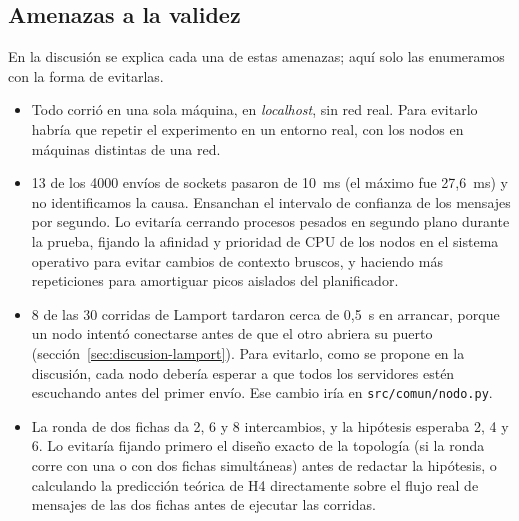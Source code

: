 \subsection{Amenazas a la validez}

En la discusión se explica cada una de estas amenazas; aquí solo las enumeramos con la forma de evitarlas.

\begin{itemize}
  \item Todo corrió en una sola máquina, en \emph{localhost}, sin red real. Para evitarlo habría que repetir el experimento en un entorno real, con los nodos en máquinas distintas de una red.
  \item 13 de los 4000 envíos de sockets pasaron de 10~ms (el máximo fue 27,6~ms) y no identificamos la causa. Ensanchan el intervalo de confianza de los mensajes por segundo. Lo evitaría cerrando procesos pesados en segundo plano durante la prueba, fijando la afinidad y prioridad de CPU de los nodos en el sistema operativo para evitar cambios de contexto bruscos, y haciendo más repeticiones para amortiguar picos aislados del planificador.
  \item 8 de las 30 corridas de Lamport tardaron cerca de 0,5~s en arrancar, porque un nodo intentó conectarse antes de que el otro abriera su puerto (sección~\ref{sec:discusion-lamport}). Para evitarlo, como se propone en la discusión, cada nodo debería esperar a que todos los servidores estén escuchando antes del primer envío. Ese cambio iría en \texttt{src/comun/nodo.py}.
  \item La ronda de dos fichas da 2, 6 y 8 intercambios, y la hipótesis esperaba 2, 4 y 6. Lo evitaría fijando primero el diseño exacto de la topología (si la ronda corre con una o con dos fichas simultáneas) antes de redactar la hipótesis, o calculando la predicción teórica de H4 directamente sobre el flujo real de mensajes de las dos fichas antes de ejecutar las corridas.
\end{itemize}
